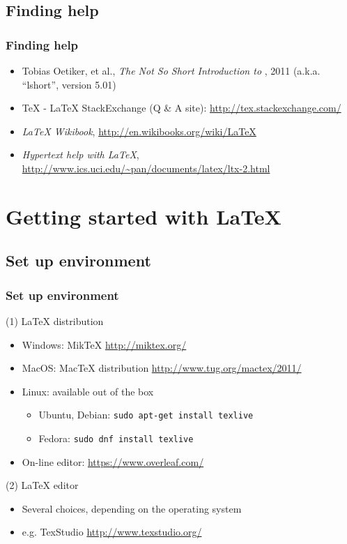 \documentclass{beamer}
\begin{document}
\subsection{Finding help}

\begin{frame}
  \frametitle{Finding help}

  \begin{itemize}
  \item Tobias Oetiker, et al., \emph{The Not So Short Introduction to {\LaTeXe}}, 2011 (a.k.a. ``lshort'', version 5.01)
  \item {\TeX} - {\LaTeX} StackExchange (Q \& A site): \url{http://tex.stackexchange.com/}
  \item \emph{{\LaTeX} Wikibook}, \url{http://en.wikibooks.org/wiki/LaTeX}
  \item \emph{Hypertext help with {\LaTeX}}, \url{http://www.ics.uci.edu/~pan/documents/latex/ltx-2.html}
  \end{itemize}

\end{frame}

\section{Getting started with {\LaTeX}}

\subsection{Set up environment}

\begin{frame}
  \frametitle{Set up environment}

(1) {\LaTeX} distribution

  \begin{itemize}
  \item Windows: MikTeX \url{http://miktex.org/}
  \item MacOS: MacTeX distribution \url{http://www.tug.org/mactex/2011/}
  \item Linux: available out of the box
    \begin{itemize}
    \item Ubuntu, Debian: \texttt{sudo apt-get install texlive}
    \item Fedora: \texttt{sudo dnf install texlive}
    \end{itemize}
  \item On-line editor: \url{https://www.overleaf.com/}
  \end{itemize}

(2) {\LaTeX} editor

  \begin{itemize}
  \item Several choices, depending on the operating system
  \item e.g. TexStudio \url{http://www.texstudio.org/}
  \end{itemize}
\end{frame}
\end{document}
